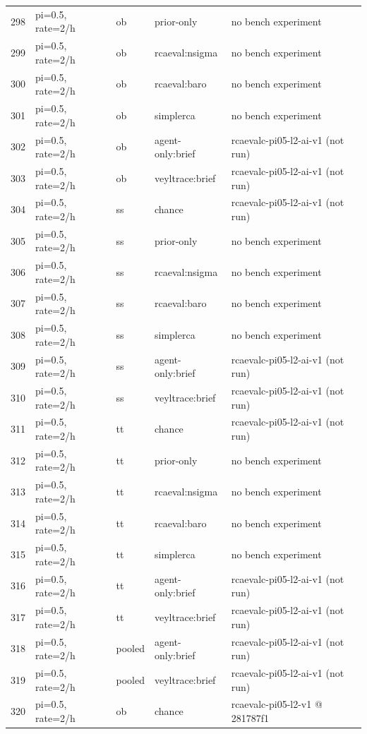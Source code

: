 \begin{longtable}{@{}r>{\raggedright\arraybackslash}p{48.0pt}>{\raggedright\arraybackslash}p{18.0pt}>{\raggedright\arraybackslash}p{108.0pt}>{\raggedright\arraybackslash}p{105.0pt}@{}}
298 & pi=0.5, rate=2/h & ob & prior-only & no bench experiment \\
299 & pi=0.5, rate=2/h & ob & rcaeval:nsigma & no bench experiment \\
300 & pi=0.5, rate=2/h & ob & rcaeval:baro & no bench experiment \\
301 & pi=0.5, rate=2/h & ob & simplerca & no bench experiment \\
302 & pi=0.5, rate=2/h & ob & agent-only:brief & rcaevalc-pi05-l2-ai-v1 (not run) \\
303 & pi=0.5, rate=2/h & ob & veyltrace:brief & rcaevalc-pi05-l2-ai-v1 (not run) \\
304 & pi=0.5, rate=2/h & ss & chance & rcaevalc-pi05-l2-ai-v1 (not run) \\
305 & pi=0.5, rate=2/h & ss & prior-only & no bench experiment \\
306 & pi=0.5, rate=2/h & ss & rcaeval:nsigma & no bench experiment \\
307 & pi=0.5, rate=2/h & ss & rcaeval:baro & no bench experiment \\
308 & pi=0.5, rate=2/h & ss & simplerca & no bench experiment \\
309 & pi=0.5, rate=2/h & ss & agent-only:brief & rcaevalc-pi05-l2-ai-v1 (not run) \\
310 & pi=0.5, rate=2/h & ss & veyltrace:brief & rcaevalc-pi05-l2-ai-v1 (not run) \\
311 & pi=0.5, rate=2/h & tt & chance & rcaevalc-pi05-l2-ai-v1 (not run) \\
312 & pi=0.5, rate=2/h & tt & prior-only & no bench experiment \\
313 & pi=0.5, rate=2/h & tt & rcaeval:nsigma & no bench experiment \\
314 & pi=0.5, rate=2/h & tt & rcaeval:baro & no bench experiment \\
315 & pi=0.5, rate=2/h & tt & simplerca & no bench experiment \\
316 & pi=0.5, rate=2/h & tt & agent-only:brief & rcaevalc-pi05-l2-ai-v1 (not run) \\
317 & pi=0.5, rate=2/h & tt & veyltrace:brief & rcaevalc-pi05-l2-ai-v1 (not run) \\
318 & pi=0.5, rate=2/h & pooled & agent-only:brief & rcaevalc-pi05-l2-ai-v1 (not run) \\
319 & pi=0.5, rate=2/h & pooled & veyltrace:brief & rcaevalc-pi05-l2-ai-v1 (not run) \\
320 & pi=0.5, rate=2/h & ob & chance & rcaevalc-pi05-l2-v1 @ 281787f1 \\

\end{longtable}
